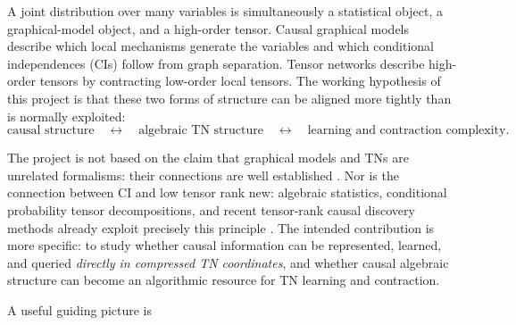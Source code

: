 \documentclass[11pt]{article}
\theoremstyle{remark}
\begin{document}
A joint distribution over many variables is simultaneously a statistical object, a graphical-model object, and a high-order tensor. Causal graphical models describe which local mechanisms generate the variables and which conditional independences (CIs) follow from graph separation. Tensor networks describe high-order tensors by contracting low-order local tensors. The working hypothesis of this project is that these two forms of structure can be aligned more tightly than is normally exploited:
\begin{equation}
\boxed{
\text{causal structure}
\quad\longleftrightarrow\quad
\text{algebraic TN structure}
\quad\longleftrightarrow\quad
\text{learning and contraction complexity}.}
\label{eq:central-hypothesis}
\end{equation}

The project is not based on the claim that graphical models and TNs are unrelated formalisms: their connections are well established \cite{robeva2019duality,miller2021hybrid,ran2019bayesian}. Nor is the connection between CI and low tensor rank new: algebraic statistics, conditional probability tensor decompositions, and recent tensor-rank causal discovery methods already exploit precisely this principle \cite{molstad2026conditional,chen2024tensor,chen2025latent}. The intended contribution is more specific: to study whether causal information can be represented, learned, and queried \emph{directly in compressed TN coordinates}, and whether causal algebraic structure can become an algorithmic resource for TN learning and contraction.

A useful guiding picture is
\begin{center}
\end{center}
\end{document}
